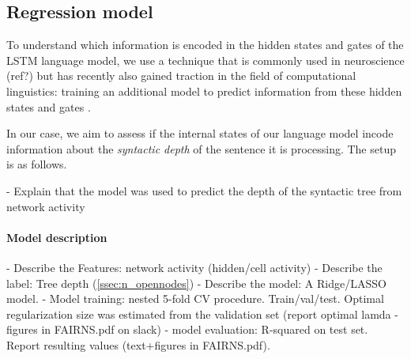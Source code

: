 \subsection{Regression model}\label{ssec:dc}

To understand which information is encoded in the hidden states and gates of the LSTM language model, we use a technique that is commonly used in neuroscience (ref?) but has recently also gained traction in the field of computational linguistics: training an additional model to predict information from these hidden states and gates \cite{Adi:etal:2017,Hupkes:etal:2017}.  

In our case, we aim to assess if the internal states of our language model incode information about the \textit{syntactic depth} of the sentence it is processing.
The setup is as follows.

- Explain that the model was used to predict the depth of the syntactic tree from network activity
\paragraph{Model description}
- Describe the Features: network activity (hidden/cell activity)
- Describe the label: Tree depth (\ref{ssec:n_opennodes})
- Describe the model: A Ridge/LASSO model.
- Model training: nested 5-fold CV procedure. Train/val/test. Optimal regularization size was estimated from the validation set (report optimal lamda - figures in FAIRNS.pdf on slack)
- model evaluation: R-squared on test set. Report resulting values (text+figures in FAIRNS.pdf). 


